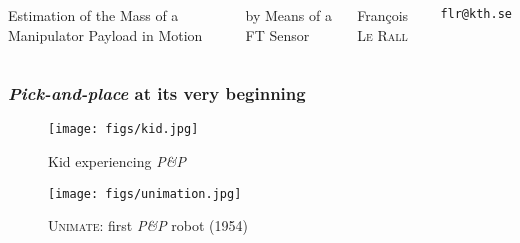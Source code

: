 \documentclass[aspectratio=1610]{beamer}
\begin{document}
\begin{frame}

  \vspace{0.02\textheight}

\begin{columns}[]
\column{37em}
\Large{\centerline{Estimation of the Mass of a Manipulator Payload in Motion}}

\Large{\centerline{ by Means of a FT Sensor}}

\vspace{0.1\textheight}

\small{\centerline{François \textsc{Le Rall}}}
\scriptsize{\centerline{\tt flr@kth.se}}
\scriptsize{\centerline{}}
\end{columns}
\end{frame}


\begin{frame}
\frametitle{\textit{Pick-and-place} at its very beginning}

\begin{figure}
\centering
  \begin{minipage}{.49\textwidth}
  \centering
  \texttt{[image: figs/kid.jpg]}
  \caption{Kid experiencing \textit{P\&P}}
  \end{minipage}
  \begin{minipage}{.49\textwidth}
  \centering
  \texttt{[image: figs/unimation.jpg]}
  \caption{\footnotesize \textsc{Unimate}: first \textit{P\&P} robot (1954)}
  \end{minipage}
\end{figure}
\end{frame}
\end{document}
